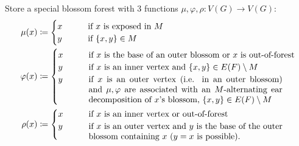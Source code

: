 \documentclass[11pt, a4paper]{article}
\newcommand{\set}[1]{\{#1\}}
\theoremstyle{remark}
\theoremstyle{definition}
\begin{document}
Store a special blossom forest with 3 functions $\mu,\varphi,\rho:
	V(G)\to V(G)$:
\begin{align*}
	\mu(x)     & \coloneqq \begin{cases}
		                       x \qquad & \text{if $x$ is exposed in $M$} \\
		                       y \qquad & \text{if $\set{x,y}\in M$}
	                       \end{cases}                                                                           \\
	\varphi(x) & \coloneqq\begin{cases}
		                      x \qquad & \text{if $x$ is the base of an outer blossom or
		                      $x$ is out-of-forest}                                                                     \\
		                      y \qquad & \text{if $x$ is an inner vertex and
		                      $\set{x,y}\in E(F)\setminus M$}                                                           \\
		                      y \qquad & \text{\parbox[t]{8cm}{if $x$ is an outer vertex (i.e. in an outer blossom) and
				                      $\mu,\varphi$ are associated with an $M$-alternating ear
				                      decomposition of $x$'s blossom, $\set{x,y}\in E(F)\setminus M$}}
	                      \end{cases} \\
	\rho(x)    & \coloneqq\begin{cases}
		                      x \qquad & \text{if $x$ is an inner vertex or out-of-forest}                          \\
		                      y \qquad & \text{\parbox[t]{8cm}{if $x$ is an outer vertex and $y$ is the base of the
				                      outer blossom containing $x$ ($y=x$ is possible).}}
	                      \end{cases}
\end{align*}
\end{document}
